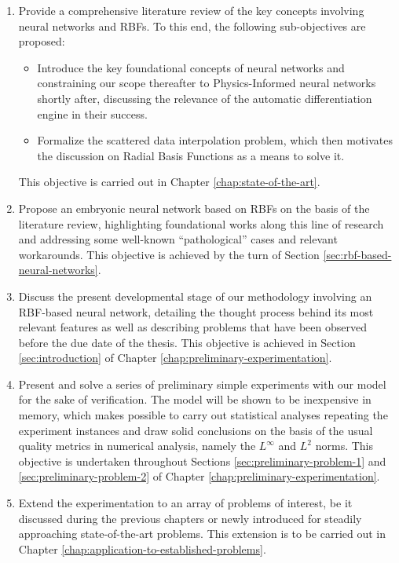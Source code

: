 \documentclass[12pt]{report} %
\begin{document}
\begin{enumerate}
  \item Provide a comprehensive literature review of the key concepts involving neural networks and RBFs. To this end, the following sub-objectives are proposed:
  \begin{itemize}
    \item Introduce the key foundational concepts of neural networks and constraining our scope thereafter to Physics-Informed neural networks shortly after, discussing the relevance of the automatic differentiation engine in their success.
    \item Formalize the scattered data interpolation problem, which then motivates the discussion on Radial Basis Functions as a means to solve it.
  \end{itemize}
  This objective is carried out in Chapter \ref{chap:state-of-the-art}.
  \item Propose an embryonic neural network based on RBFs on the basis of the literature review, highlighting foundational works along this line of research and addressing some well-known ``pathological'' cases and relevant workarounds. This objective is achieved by the turn of Section \ref{sec:rbf-based-neural-networks}.
  \item Discuss the present developmental stage of our methodology involving an RBF-based neural network, detailing the thought process behind its most relevant features as well as describing problems that have been observed before the due date of the thesis. This objective is achieved in Section \ref{sec:introduction} of Chapter \ref{chap:preliminary-experimentation}.
  \item Present and solve a series of preliminary simple experiments with our model for the sake of verification. The model will be shown to be inexpensive in memory, which makes possible to carry out statistical analyses repeating the experiment instances and draw solid conclusions on the basis of the usual quality metrics in numerical analysis, namely the $L^\infty$ and $L^2$ norms. This objective is undertaken throughout Sections \ref{sec:preliminary-problem-1} and \ref{sec:preliminary-problem-2} of Chapter \ref{chap:preliminary-experimentation}.
  \item Extend the experimentation to an array of problems of interest, be it discussed during the previous chapters or newly introduced for steadily approaching state-of-the-art problems. This extension is to be carried out in Chapter \ref{chap:application-to-established-problems}.
\end{enumerate}
\end{document}
